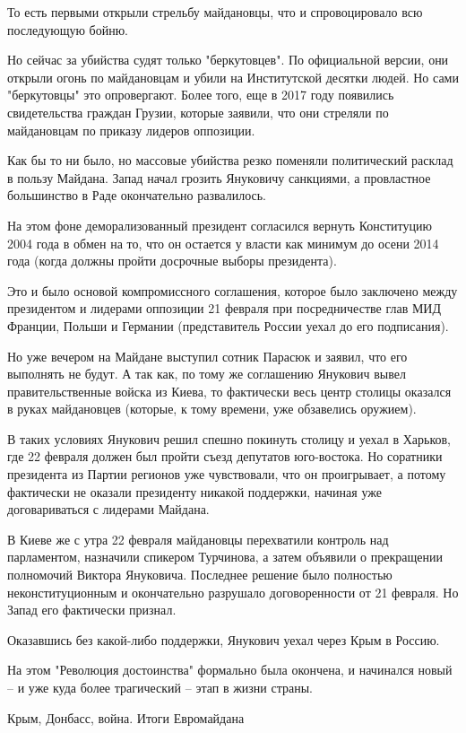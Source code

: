 То есть первыми открыли стрельбу майдановцы, что и спровоцировало всю
последующую бойню.

Но сейчас за убийства судят только "беркутовцев". По официальной версии,
они открыли огонь по майдановцам и убили на Институтской десятки людей. Но
сами "беркутовцы" это опровергают. Более того, еще в 2017 году появились
свидетельства граждан Грузии, которые заявили, что они стреляли по
майдановцам по приказу лидеров оппозиции. 

Как бы то ни было, но массовые убийства резко поменяли политический
расклад в пользу Майдана. Запад начал грозить Януковичу санкциями, а
провластное большинство в Раде окончательно развалилось.

На этом фоне деморализованный президент согласился вернуть Конституцию
2004 года в обмен на то, что он остается у власти как минимум до осени
2014 года (когда должны пройти досрочные выборы президента).

Это и было основой компромиссного соглашения, которое было заключено между
президентом и лидерами оппозиции 21 февраля при посредничестве глав МИД
Франции, Польши и Германии (представитель России уехал до его подписания).

Но уже вечером на Майдане выступил сотник Парасюк и заявил, что его
выполнять не будут. А так как, по тому же соглашению Янукович вывел
правительственные войска из Киева, то фактически весь центр столицы
оказался в руках майдановцев (которые, к тому времени, уже обзавелись
оружием). 

В таких условиях Янукович решил спешно покинуть столицу и уехал в Харьков,
где 22 февраля должен был пройти съезд депутатов юго-востока. Но соратники
президента из Партии регионов уже чувствовали, что он проигрывает, а
потому фактически не оказали президенту никакой поддержки, начиная уже
договариваться с лидерами Майдана.

В Киеве же с утра 22 февраля майдановцы перехватили контроль над
парламентом, назначили спикером Турчинова, а затем объявили о прекращении
полномочий Виктора Януковича. Последнее решение было полностью
неконституционным и окончательно разрушало договоренности от 21 февраля.
Но Запад его фактически признал.

Оказавшись без какой-либо поддержки, Янукович уехал через Крым в Россию. 

На этом "Революция достоинства" формально была окончена, и начинался новый
– и уже куда более трагический – этап в жизни страны. 

Крым, Донбасс, война. Итоги Евромайдана

